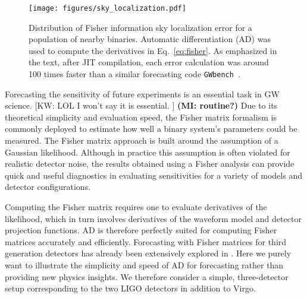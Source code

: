 \documentclass[twocolumn]{aastex631}
\newcommand{\kw}[1]{{\color{rb4}[KW: #1 ]}}
\newcommand{\mi}[1]{\textbf{\color{teal}(MI: #1)}}
\begin{document}
\begin{figure}[t!]
    \centering
    \texttt{[image: figures/sky\_localization.pdf]}
    \caption{
        Distribution of Fisher information sky localization error for a population of nearby binaries.
        Automatic differentiation (AD) was used to compute the derivatives in Eq.~\ref{eq:fisher}.
        As emphasized in the text, after JIT compilation, each error calculation was around 100 times faster than a similar forecasting code \texttt{GWbench}~\citep{Borhanian:2020ypi}.
    }
    \label{fig:sky_localization}
\end{figure}

Forecasting the sensitivity of future experiments is an essential task in GW science. \kw{LOL I won't say it is essential.} \mi{routine?}
Due to its theoretical simplicity and evaluation speed, the Fisher matrix formalism is commonly deployed to estimate how well a binary system's parameters could be measured.
The Fisher matrix approach is built around the assumption of a Gaussian likelihood.
Although in practice this assumption is often violated for realistic detector noise, the results obtained using a Fisher analysis can provide quick and useful diagnostics in evaluating sensitivities for a variety of models and detector configurations.

Computing the Fisher matrix requires one to evaluate derivatives of the likelihood, which in turn involves derivatives of the waveform model and detector projection functions.
AD is therefore perfectly suited for computing Fisher matrices accurately and efficiently. 
Forecasting with Fisher matrices for third generation detectors has already been extensively explored in \citep{Iacovelli:2022bbs, Iacovelli:2022mbg}.
Here we purely want to illustrate the simplicity and speed of AD for forecasting rather than providing new physics insights.
We therefore consider a simple, three-detector setup corresponding to the two LIGO detectors in addition to Virgo.
\end{document}
